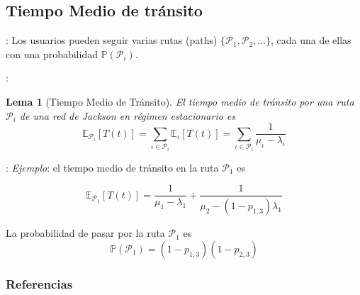 \documentclass[xcolor={x11names}]{beamer}
\newtheorem{lema}{Lema}[section]
\begin{document}
\subsection{Tiempo Medio de tránsito}
\begin{frame}{\secname: \subsecname}
    Los usuarios pueden seguir varias rutas
    (paths) $\{\mathcal{P}_1,\mathcal{P}_2,
    \ldots\}$, cada una
    de ellas con una probabilidad
    $\mathbb{P}\left( \mathcal{P}_i \right)$.
    \vfill
    \begin{figure}
        
    \end{figure}
\end{frame}


\begin{frame}{\secname: \subsecname}
    \begin{lema}[Tiempo Medio de Tránsito]
        El tiempo medio de tránsito por una
        ruta $\mathcal{P}_i$ de una red
        de Jackson en régimen estacionario es
        \begin{equation}
            \mathbb{E}_{\mathcal{P}_i}[T(t)]
            =\sum_{\iota\in \mathcal{P}_i}
            \mathbb{E}_{\iota}[T(t)]
            =\sum_{\iota\in \mathcal{P}_i}
            \frac{1}{\mu_\iota-\lambda_\iota}
        \end{equation}
    \end{lema}
\end{frame}


\begin{frame}{\secname: \subsecname}
    \textit{Ejemplo}: el tiempo medio de
    tránsito en la ruta $\mathcal{P}_1$ es

    \begin{equation}
        \mathbb{E}_{\mathcal{P}_1}[T(t)]=
        \frac{1}{\mu_1-\lambda_1}+
        \frac{1}{\mu_2-(1-p_{1,3})\lambda_1}
    \end{equation}

    La probabilidad de pasar por la ruta
    $\mathcal{P}_1$ es
    \begin{equation}
        \mathbb{P}(\mathcal{P}_1)=
        (1-p_{1,3})(1-p_{2,3})
    \end{equation}

    \begin{figure}
        \resizebox{.7\textwidth}{!}{%
        }
    \end{figure}
\end{frame}


\begin{frame}[allowframebreaks]
        \frametitle{Referencias}
        
        
\end{frame}
\end{document}
